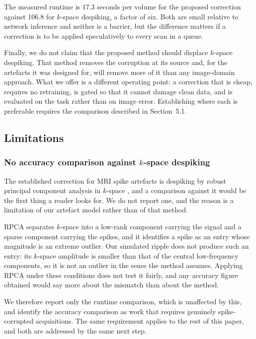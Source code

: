 \documentclass[12pt]{article}
\theoremstyle{definition}
\theoremstyle{plain}
\begin{document}
The measured runtime is 17.3 seconds per volume for the proposed correction against
106.8 for $k$-space despiking, a factor of six. Both are small relative to network
inference and neither is a barrier, but the difference matters if a correction is to
be applied speculatively to every scan in a queue.

Finally, we do not claim that the proposed method should displace $k$-space
despiking. That method removes the corruption at its source and, for the artefacts
it was designed for, will remove more of it than any image-domain approach. What we
offer is a different operating point: a correction that is cheap, requires no
retraining, is gated so that it cannot damage clean data, and is evaluated on the
task rather than on image error. Establishing where each is preferable requires the
comparison described in Section~5.1.

\subsection{Limitations}

\subsubsection{No accuracy comparison against $k$-space despiking}

The established correction for MRI spike artefacts is despiking by robust principal
component analysis in $k$-space \cite{campbell2016}, and a comparison against it
would be the first thing a reader looks for. We do not report one, and the reason is
a limitation of our artefact model rather than of that method.

RPCA separates $k$-space into a low-rank component carrying the signal and a sparse
component carrying the spikes, and it identifies a spike as an entry whose magnitude
is an extreme outlier. Our simulated ripple does not produce such an entry: its
$k$-space amplitude is smaller than that of the central low-frequency components, so
it is not an outlier in the sense the method assumes. Applying RPCA under these
conditions does not test it fairly, and any accuracy figure obtained would say more
about the mismatch than about the method.

We therefore report only the runtime comparison, which is unaffected by this, and
identify the accuracy comparison as work that requires genuinely spike-corrupted
acquisitions. The same requirement applies to the rest of this paper, and both are
addressed by the same next step.
\end{document}
